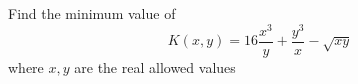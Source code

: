 Find the minimum value of $$K(x,y)=16\frac{x^3}{y}+\frac{y^3}{x}-\sqrt{xy}$$where  $x,y$ are the real allowed values